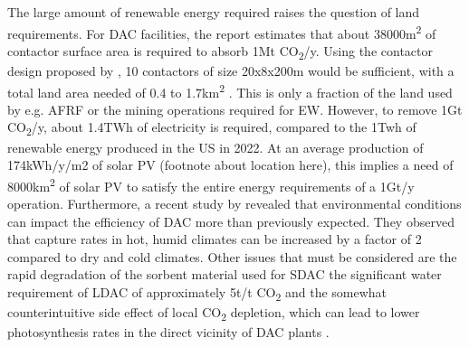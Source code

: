 The large amount of renewable energy required raises the question of land requirements. For DAC facilities, the \textcite{NAS2018NegativeAgenda} report estimates that about 38000m\textsuperscript{2} of contactor surface area is required to absorb 1Mt CO\textsubscript{2}/y. Using the contactor design proposed by \textcite{Holmes2012AnAir}, 10 contactors of size 20x8x200m would be sufficient, with a total land area needed of 0.4 to 1.7km\textsuperscript{2} \parencite[23]{IEA2022DirectZero}. This is only a fraction of the land used by e.g. AFRF or the mining operations required for EW.
However, to remove 1Gt CO\textsubscript{2}/y, about 1.4TWh of electricity is required, compared to the 1Twh of renewable energy produced in the US in 2022. At an average production of 174kWh/y/m2 of solar PV (footnote about location here), this implies a need of 8000km\textsuperscript{2} of solar PV to satisfy the entire energy requirements of a 1Gt/y operation.
Furthermore, a recent study by \textcite{An2022TheSystems} revealed that environmental conditions can impact the efficiency of DAC more than previously expected. They observed that capture rates in hot, humid climates can be increased by a factor of 2 compared to dry and cold climates. Other issues that must be considered are the rapid degradation of the sorbent material used for SDAC \textcite{Lawler2022WhatTechnology} the significant water requirement of LDAC of approximately 5t/t CO\textsubscript{2} \textcite{IEA2022DirectZero} and the somewhat counterintuitive side effect of local CO\textsubscript{2} depletion, which can lead to lower photosynthesis rates in the direct vicinity of DAC plants \parencite[230]{NAS2018NegativeAgenda}.
